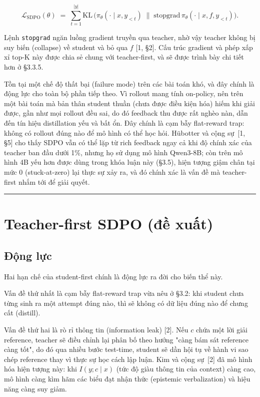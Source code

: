 \[
\mathcal{L}_{\text{SDPO}}(\theta) \;=\; \sum_{t=1}^{|y|} \mathrm{KL}\,\Big(\pi_\theta(\cdot \mid x, y_{<t}) \;\big\|\; \mathrm{stopgrad}\,\pi_\theta(\cdot \mid x, f, y_{<t})\Big).
\]

Lệnh \passthrough{\lstinline!stopgrad!} ngăn luồng gradient truyền qua teacher, nhờ vậy teacher không bị suy biến (collapse) về student và bỏ qua \(f\) {[}1, §2{]}. Cấu trúc gradient và phép xấp xỉ top-K này được chia sẻ chung với teacher-first, và sẽ được trình bày chi tiết hơn ở §3.3.5.

Tồn tại một chế độ thất bại (failure mode) trên các bài toán khó, và đây chính là động lực cho toàn bộ phần tiếp theo. Vì rollout mang tính on-policy, nên trên một bài toán mà bản thân student thuần (chưa được điều kiện hóa) hiếm khi giải được, gần như mọi rollout đều sai, do đó feedback thu được rất nghèo nàn, dẫn đến tín hiệu distillation yếu và bất ổn. Đây chính là cạm bẫy flat-reward trap: không có rollout đúng nào để mô hình có thể học hỏi. Hübotter và cộng sự~{[}1, §5{]} cho thấy SDPO vẫn có thể lặp từ rich feedback ngay cả khi độ chính xác của teacher ban đầu dưới 1\%, nhưng họ sử dụng mô hình Qwen3-8B; còn trên mô hình 4B yếu hơn được dùng trong khóa luận này (§3.5), hiện tượng giậm chân tại mức 0 (stuck-at-zero) lại thực sự xảy ra, và đó chính xác là vấn đề mà teacher-first nhắm tới để giải quyết.

\begin{center}\rule{0.5\linewidth}{0.5pt}\end{center}

\section{Teacher-first SDPO (đề xuất)}\label{teacher-first-sdpo-proposed}

\subsection{Động lực}\label{motivation}

Hai hạn chế của student-first chính là động lực ra đời cho biến thể này.

Vấn đề thứ nhất là cạm bẫy flat-reward trap vừa nêu ở §3.2: khi student chưa từng sinh ra một attempt đúng nào, thì sẽ không có dữ liệu đúng nào để chưng cất (distill).

Vấn đề thứ hai là rò rỉ thông tin (information leak) {[}2{]}. Nếu \(c\) chứa một lời giải reference, teacher sẽ điều chỉnh lại phân bố theo hướng "càng bám sát reference càng tốt", do đó qua nhiều bước test-time, student sẽ dần hội tụ về hành vi sao chép reference thay vì thực sự học cách lập luận. Kim và cộng sự~{[}2{]} đã mô hình hóa hiện tượng này: khi \(I(y; c \mid x)\) (tức độ giàu thông tin của context) càng cao, mô hình càng kìm hãm các biểu đạt nhận thức (epistemic verbalization) và hiệu năng càng suy giảm.

